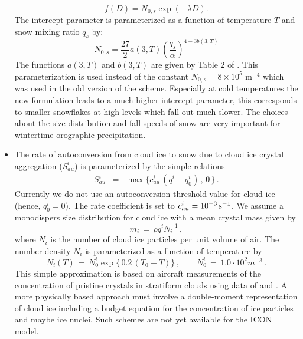 \begin{itemize}
\begin{equation*}
    f(D) = N_{0,s} \exp(-\lambda D).
  \end{equation*}
  The intercept parameter is parameterized
  as a function of temperature $T$ and snow mixing ratio $q_s$ by:
  \begin{equation*}
    N_{0,s} = \frac{27}{2} a(3,T) \left(\frac{q_s}{\alpha}\right)^{4-3b(3,T)}
  \end{equation*}
  The functions $a(3,T)$ and $b(3,T)$ are given by Table 2
  of \citet{Field-2005}. This parameterization is used instead of the constant
  $N_{0,s}=8\times10^5$ m$^{-4}$ which was used in the old version of
  the scheme. Especially at cold temperatures the new formulation leads to a much higher
  intercept parameter, this corresponds to smaller snowflakes at
  high levels which fall out much slower. The choices about the size
  distribution and fall speeds of snow are very important for wintertime
  orographic precipitation.
    
\item The rate of autoconversion from cloud ice to snow due to 
  cloud ice crystal aggregation ($S_{au}^i$) is parameterized by the simple 
  relations
  \begin{eqnarray}
    S_{au}^i &=& \max\{ c^i_{au}\,( q^i - q^i_0 )\,,\, 0 \,\}\,. \label{7.5-18}
  \end{eqnarray}
  Currently we do not use an autoconversion threshold value for cloud ice
  (hence, $q^i_0 = 0$).  The rate coefficient is set to $c^i_{au}= 10^{-3}\,\rm
  s^{-1}$.  We assume a monodispers size distribution for cloud ice with a
  mean crystal mass given by
  \begin{equation}
    m_i \,=\, \rho q^i N_i^{-1}\,,\label{7.5-1}
  \end{equation}
  where $N_i$ is the number of cloud ice particles per unit volume of air. The
  number density $N_i$ is parameterized as a function of temperature by
  \begin{equation}
    N_i(T)\,=\, N_0^i \exp \{ \,0.2 \,(T_0 -T)\}\,,\qquad N_0^i 
    \,=\,1.0\cdot 10^2 m^{-3}\,. \label{7.5-3} 
  \end{equation}
  This simple approximation is based on aircraft measurements of the
  concentration of pristine crystals in stratiform clouds using data of
  \citet{Hobbs-Rangno-1985} and \citet{Meyers-1992}.  A more physically based
  approach must involve a double-moment representation of cloud ice including
  a budget equation for the concentration of ice particles and maybe ice
  nuclei. Such schemes are not yet available for the ICON model.


\end{itemize}
